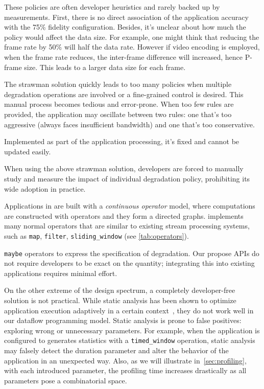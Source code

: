  These policies are often developer heuristics and
rarely backed up by measurements. First, there is no direct association of the
application accuracy with the 75\% fidelity configuration. Besides, it's unclear
about how much the policy would affect the data size. For example, one might
think that reducing the frame rate by 50\% will half the data rate. However if
video encoding is employed, when the frame rate reduces, the inter-frame
difference will increased, hence P-frame size. This leads to a larger data size
for each frame.


 The strawman solution quickly leads to too many
policies when multiple degradation operations are involved or a fine-grained
control is desired. This manual process becomes tedious and error-prone. When
too few rules are provided, the application may oscillate between two rules: one
that's too aggressive (always faces insufficient bandwidth) and one that's too
conservative.

 Implemented as part of the application processing, it's fixed and
cannot be updated easily.

When using the above strawman solution, developers are forced to manually study
and measure the impact of individual degradation policy, prohibiting its wide
adoption in practice.


Applications in \sysname{} are built with a \textit{continuous operator} model,
where computations are constructed with operators and they form a directed
graphs. \sysname{} implements many normal operators that are similar to existing
stream processing systems, such as \texttt{map}, \texttt{filter},
\texttt{sliding\_window} (see \autoref{tab:operators}).

\texttt{maybe} operators to express the specification of degradation. Our
propose APIs do not require developers to be exact on the quantity; integrating
this into existing applications requires minimal effort.


On the other extreme of the design spectrum, a completely developer-free
solution is not practical. While static analysis has been shown to optimize
application execution adaptively in a certain context~\cite{chun2011clonecloud},
they do not work well in our dataflow programming model. Static analysis is
prone to false positives: exploring wrong or unnecessary parameters. For
example, when the application is configured to generates statistics with a
\texttt{timed\_window} operation, static analysis may falsely detect the
duration parameter and alter the behavior of the application in an unexpected
way. Also, as we will illustrate in~\autoref{sec:profiling}, with each
introduced parameter, the profiling time increases drastically as all parameters
pose a combinatorial space.

